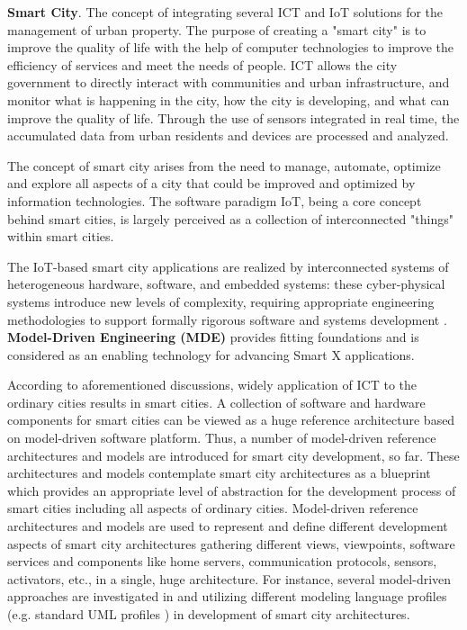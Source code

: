 \textbf{Smart City}. The concept of integrating several ICT and IoT solutions for the management of urban property. The purpose of creating a "smart city" is to improve the quality of life with the help of computer technologies to improve the efficiency of services and meet the needs of people. ICT allows the city government to directly interact with communities and urban infrastructure, and monitor what is happening in the city, how the city is developing, and what can improve the quality of life. Through the use of sensors integrated in real time, the accumulated data from urban residents and devices are processed and analyzed. 

The concept of smart city arises from the need to manage, automate, optimize and explore all aspects of a city that could be improved and optimized by information technologies. The software paradigm IoT, being a core concept behind smart cities, is largely perceived as a collection of interconnected "things" within smart cities.

The IoT-based smart city applications are realized by interconnected systems of heterogeneous hardware, software, and embedded systems: these cyber-physical systems introduce new levels of complexity, requiring appropriate engineering methodologies to support formally rigorous software and systems development \cite{Kuryazov+2018}. \textbf{Model-Driven Engineering (MDE)} provides fitting foundations and is considered as an enabling technology for advancing Smart X applications.

According to aforementioned discussions, widely application of ICT to the ordinary cities results in smart cities. A collection of software and hardware components for smart cities can be viewed as a huge reference architecture based on model-driven software platform. Thus, a number of model-driven reference architectures \cite{KateuleWinter2018} and models \cite{Yin+2015} are introduced for smart city development, so far. These architectures and models contemplate smart city architectures as a blueprint which provides an appropriate level of abstraction for the development process of smart cities including all aspects of ordinary cities. Model-driven reference architectures and models are used to represent and define different development aspects of smart city architectures gathering different views, viewpoints, software services and components like home servers, communication protocols, sensors, activators, etc., in a single, huge architecture. For instance, several model-driven approaches are investigated in \cite{Corredor+2012} and \cite{KleanthisFoivos2016} utilizing different modeling language profiles (e.g. standard UML profiles \cite{Rumbaugh+2004}) in development of smart city architectures.

